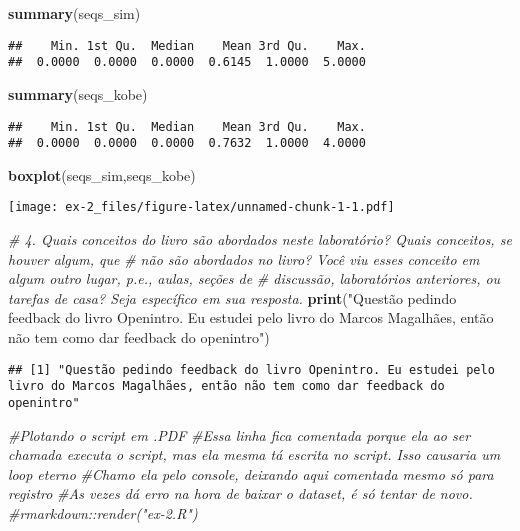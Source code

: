 \documentclass[]{article}
\newenvironment{Shaded}{\begin{snugshade}}{\end{snugshade}}
\newcommand{\KeywordTok}[1]{\textcolor[rgb]{0.13,0.29,0.53}{\textbf{#1}}}
\newcommand{\StringTok}[1]{\textcolor[rgb]{0.31,0.60,0.02}{#1}}
\newcommand{\CommentTok}[1]{\textcolor[rgb]{0.56,0.35,0.01}{\textit{#1}}}
\newcommand{\NormalTok}[1]{#1}
\begin{document}
\begin{Shaded}
\begin{Highlighting}[]
\KeywordTok{summary}\NormalTok{(seqs_sim)}
\end{Highlighting}
\end{Shaded}

\begin{verbatim}
##    Min. 1st Qu.  Median    Mean 3rd Qu.    Max. 
##  0.0000  0.0000  0.0000  0.6145  1.0000  5.0000
\end{verbatim}

\begin{Shaded}
\begin{Highlighting}[]
\KeywordTok{summary}\NormalTok{(seqs_kobe)}
\end{Highlighting}
\end{Shaded}

\begin{verbatim}
##    Min. 1st Qu.  Median    Mean 3rd Qu.    Max. 
##  0.0000  0.0000  0.0000  0.7632  1.0000  4.0000
\end{verbatim}

\begin{Shaded}
\begin{Highlighting}[]
\KeywordTok{boxplot}\NormalTok{(seqs_sim,seqs_kobe)}
\end{Highlighting}
\end{Shaded}

\texttt{[image: ex-2\_files/figure-latex/unnamed-chunk-1-1.pdf]}

\begin{Shaded}
\begin{Highlighting}[]
\CommentTok{# 4. Quais conceitos do livro são abordados neste laboratório? Quais conceitos, se houver algum, que}
\CommentTok{# não são abordados no livro? Você viu esses conceito em algum outro lugar, p.e., aulas, seções de}
\CommentTok{# discussão, laboratórios anteriores, ou tarefas de casa? Seja específico em sua resposta.}
\KeywordTok{print}\NormalTok{(}\StringTok{"Questão pedindo feedback do livro Openintro. Eu estudei pelo livro do Marcos Magalhães, então não tem como dar feedback do openintro"}\NormalTok{)}
\end{Highlighting}
\end{Shaded}

\begin{verbatim}
## [1] "Questão pedindo feedback do livro Openintro. Eu estudei pelo livro do Marcos Magalhães, então não tem como dar feedback do openintro"
\end{verbatim}

\begin{Shaded}
\begin{Highlighting}[]
\CommentTok{#Plotando o script em .PDF}
\CommentTok{#Essa linha fica comentada porque ela ao ser chamada executa o script, mas ela mesma tá escrita no script. Isso causaria um loop eterno}
\CommentTok{#Chamo ela pelo console, deixando aqui comentada mesmo só para registro}
\CommentTok{#As vezes dá erro na hora de baixar o dataset, é só tentar de novo.}
\CommentTok{#rmarkdown::render("ex-2.R")}
\end{Highlighting}
\end{Shaded}
\end{document}
